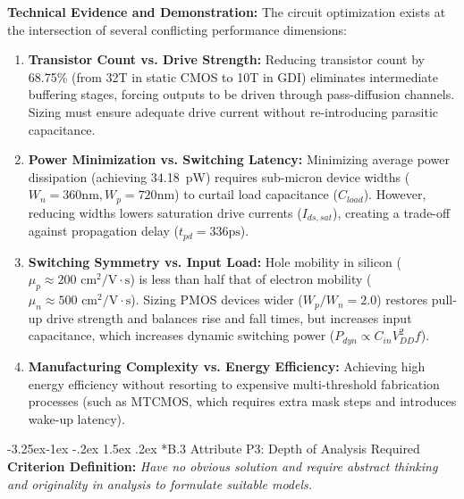 \documentclass[12pt,a4paper,oneside]{report}
\makeatletter
\renewcommand\subsection{\@startsection{subsection}{2}{\z@}%
                                     {-3.25ex\@plus -1ex \@minus -.2ex}%
                                     {1.5ex \@plus .2ex}%
                                     {\normalfont\normalsize\bfseries\itshape}}
\makeatother
\begin{document}
\noindent\textbf{Technical Evidence and Demonstration:}
The circuit optimization exists at the intersection of several conflicting performance dimensions:
\begin{enumerate}
\item \textbf{Transistor Count vs. Drive Strength:} Reducing transistor count by 68.75\% (from 32T in static CMOS to 10T in GDI) eliminates intermediate buffering stages, forcing outputs to be driven through pass-diffusion channels. Sizing must ensure adequate drive current without re-introducing parasitic capacitance.
\item \textbf{Power Minimization vs. Switching Latency:} Minimizing average power dissipation (achieving 34.18~pW) requires sub-micron device widths ($W_n = 360\text{nm}, W_p = 720\text{nm}$) to curtail load capacitance ($C_{load}$). However, reducing widths lowers saturation drive currents ($I_{ds,sat}$), creating a trade-off against propagation delay ($t_{pd} = 336\text{ps}$).
\item \textbf{Switching Symmetry vs. Input Load:} Hole mobility in silicon ($\mu_p \approx 200\text{ cm}^2/\text{V}\cdot\text{s}$) is less than half that of electron mobility ($\mu_n \approx 500\text{ cm}^2/\text{V}\cdot\text{s}$). Sizing PMOS devices wider ($W_p/W_n = 2.0$) restores pull-up drive strength and balances rise and fall times, but increases input capacitance, which increases dynamic switching power ($P_{dyn} \propto C_{in} V_{DD}^2 f$).
\item \textbf{Manufacturing Complexity vs. Energy Efficiency:} Achieving high energy efficiency without resorting to expensive multi-threshold fabrication processes (such as MTCMOS, which requires extra mask steps and introduces wake-up latency).
\end{enumerate}

\subsection*{B.3 Attribute P3: Depth of Analysis Required}
\textbf{Criterion Definition:} \textit{Have no obvious solution and require abstract thinking and originality in analysis to formulate suitable models.}
\end{document}
